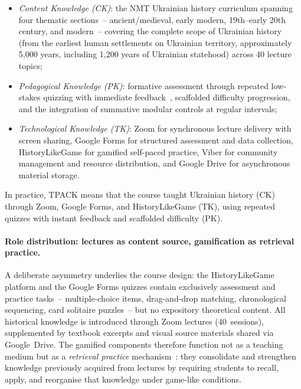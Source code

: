 \begin{itemize}
\item \emph{Content Knowledge (CK)}: the NMT Ukrainian history curriculum spanning four thematic sections~-- ancient/medieval, early modern, 19th--early 20th century, and modern~-- covering the complete scope of Ukrainian history (from the earliest human settlements on Ukrainian territory, approximately 5,000 years, including 1,200 years of Ukrainian statehood) across 40 lecture topics;
\item \emph{Pedagogical Knowledge (PK)}: formative assessment through repeated low-stakes quizzing with immediate feedback~\cite{Hattie2009}, scaffolded difficulty progression, and the integration of summative modular controls at regular intervals;
\item \emph{Technological Knowledge (TK)}: Zoom for synchronous lecture delivery with screen sharing, Google Forms for structured assessment and data collection, HistoryLikeGame for gamified self-paced practice, Viber for community management and resource distribution, and Google Drive for asynchronous material storage.
\end{itemize}

\noindent In practice, TPACK means that the course taught Ukrainian history (CK) through Zoom, Google Forms, and HistoryLikeGame (TK), using repeated quizzes with instant feedback and scaffolded difficulty (PK).

\paragraph{Role distribution: lectures as content source, gamification as retrieval practice.}
A deliberate asymmetry underlies the course design: the HistoryLikeGame platform and the Google Forms quizzes contain exclusively assessment and practice tasks~-- multiple-choice items, drag-and-drop matching, chronological sequencing, card solitaire puzzles~-- but no expository theoretical content. All historical knowledge is introduced through Zoom lectures (40~sessions), supplemented by textbook excerpts and visual source materials shared via Google~Drive. The gamified components therefore function not as a teaching medium but as a \emph{retrieval practice} mechanism~\cite{RoedigerButler2011}: they consolidate and strengthen knowledge previously acquired from lectures by requiring students to recall, apply, and reorganise that knowledge under game-like conditions.

